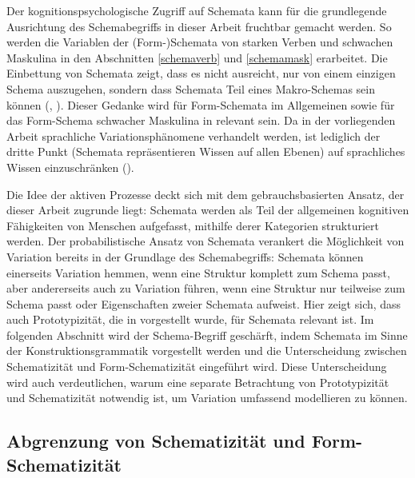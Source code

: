 Der kognitionspsychologische Zugriff auf Schemata kann für die grundlegende Ausrichtung des Schemabegriffs in dieser Arbeit fruchtbar gemacht werden. So werden die Variablen der (Form-)Schemata von starken Verben und schwachen Maskulina in den Abschnitten \ref{schemaverb} und \ref{schemamask} erarbeitet. Die Einbettung von Schemata zeigt, dass es nicht ausreicht, nur von einem einzigen Schema auszugehen, sondern dass Schemata Teil eines Makro-Schemas sein können (\cite[14--21]{Nesset.2008}, \cite[344--345]{Booij.2012}). Dieser Gedanke wird für Form-Schemata im Allgemeinen sowie für das Form-Schema schwacher Maskulina in  relevant sein. Da in der vorliegenden Arbeit sprachliche Variationsphänomene verhandelt werden, ist lediglich der dritte Punkt (Schemata repräsentieren Wissen auf allen Ebenen) auf sprachliches Wissen einzuschränken (\cite[26]{Barlow.1994}). 



Die Idee der aktiven Prozesse deckt sich mit dem gebrauchsbasierten Ansatz, der dieser Arbeit zugrunde liegt: Schemata werden als Teil der allgemeinen kognitiven Fähigkeiten von Menschen aufgefasst, mithilfe derer Kategorien strukturiert werden. Der probabilistische Ansatz von Schemata verankert die Möglichkeit von Variation bereits in der Grundlage des Schemabegriffs: Schemata können einerseits Variation hemmen, wenn eine Struktur komplett zum Schema passt, aber andererseits auch zu Variation führen, wenn eine Struktur nur teilweise zum Schema passt oder Eigenschaften zweier Schemata aufweist. Hier zeigt sich, dass auch Prototypizität, die in  vorgestellt wurde, für Schemata relevant ist. Im folgenden Abschnitt wird der Schema-Begriff geschärft, indem Schemata im Sinne der Konstruktionsgrammatik vorgestellt werden und die Unterscheidung zwischen Schematizität und Form-Schematizität eingeführt wird. Diese Unterscheidung wird auch verdeutlichen, warum eine separate Betrachtung von Prototypizität und Schematizität notwendig ist, um Variation umfassend modellieren zu können.

\subsection{Abgrenzung von Schematizität und Form-Schematizität}
\label{konstruktion}


